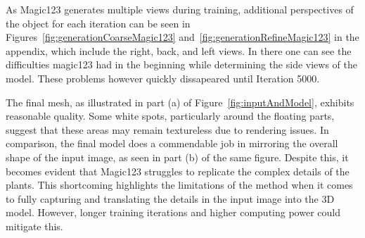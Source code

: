 As Magic123 generates multiple views during training, additional perspectives of the object for each iteration can be seen in Figures~\ref{fig:generationCoarseMagic123} and~\ref{fig:generationRefineMagic123} in the appendix, which include the right, back, and left views. In there one can see the difficulties magic123 had in the beginning while determining the side views of the model. These problems however quickly dissapeared until Iteration 5000. 

The final mesh, as illustrated in part (a) of Figure~\ref{fig:inputAndModel}, exhibits reasonable quality. Some white spots, particularly around the floating parts, suggest that these areas may remain textureless due to rendering issues. In comparison, the final model does a commendable job in mirroring the overall shape of the input image, as seen in part (b) of the same figure. Despite this, it becomes evident that Magic123 struggles to replicate the complex details of the plants. This shortcoming highlights the limitations of the method when it comes to fully capturing and translating the details in the input image into the 3D model. However, longer training iterations and higher computing power could mitigate this.

